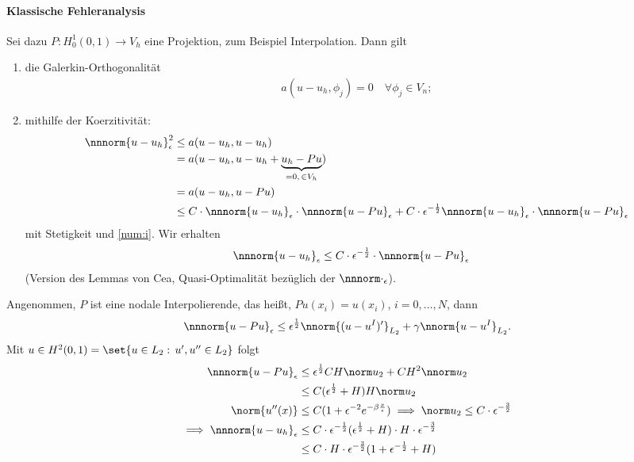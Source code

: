 \paragraph{Klassische Fehleranalysis}
Sei dazu $P: H_{0}^{1}(0, 1) \to V_{h}$ eine Projektion, zum Beispiel Interpolation. Dann gilt
\begin{enumerate}
\item \label{num:i} die Galerkin-Orthogonalität
  \begin{align*}
    a(u - u_{h}, \phi_{j}) = 0 \quad \forall \phi_{j}\in V_{n};
  \end{align*}
\item \label{num:ii}mithilfe der Koerzitivität:
  \begin{align*}
    \nnnorm{u-u_{h}}_{\epsilon}^{2} &\leq a(u-u_{h}, u- u_{h})\\
    &= a(u-u_{h}, u-u_{h}+ \underbrace{u_{h} - Pu}_{= 0, \, \in V_{h}})\\
    &= a(u-u_{h}, u- Pu)\\
    &\leq C\cdot \nnnorm{u-u_{h}}_{\epsilon} \cdot\nnnorm{u-Pu}_{\epsilon} + C\cdot \epsilon^{-\frac 12} \nnnorm{u-u_{h}}_{\epsilon}\cdot\nnnorm{u-Pu}_{\epsilon}
  \end{align*}
  mit Stetigkeit und \ref{num:i}. Wir erhalten
  \begin{align*}
    \nnnorm{u-u_{h}}_{\epsilon} &\leq  C\cdot \epsilon^{-\frac 12} \cdot \nnnorm{u-Pu}_{\epsilon}
  \end{align*}
  (Version des Lemmas von Cea, Quasi-Optimalität bezüglich der $\nnnorm\cdot_{\epsilon}$). 
\end{enumerate}
Angenommen, $P$ ist eine nodale Interpolierende, das heißt, $Pu(x_{i}) = u(x_{i})$, $i = 0, \dots, N$, dann
\begin{align*}
  \nnnorm{u-Pu}_{\epsilon} \leq \epsilon^{\frac 12}\nnorm{(u-u^{I})'}_{L_{2}} + \gamma \nnorm{u-u^{I}}_{L_{2}}. 
\end{align*}
Mit $u \in H^{2}(0, 1) = \set{u \in L_{2}: \,  u', u'' \in L_{2}}$ folgt
\begin{align*}
  \nnnorm{u - Pu}_{\epsilon} &\leq \epsilon^{\frac 12} C H\norm u_{2} + CH^{2} \nnorm u_{2}\\
  &\leq C(\epsilon^{\frac 12} + H) H\norm u_{2} \\
  \norm{u''(x)}&\leq C(1 + \epsilon^{-2}e^{- \beta \frac x \epsilon}) \implies \norm u_{2} \leq C\cdot\epsilon^{- \frac 32}\\
  \implies \nnnorm{u-u_{h}}_{\epsilon} &\leq C \cdot \epsilon^{- \frac 12}(\epsilon^{\frac 12} + H)\cdot H\cdot \epsilon^{- \frac 32}\\
  &\leq C \cdot H\cdot \epsilon^{- \frac 32}(1 + \epsilon^{-\frac 12} + H)
\end{align*}
